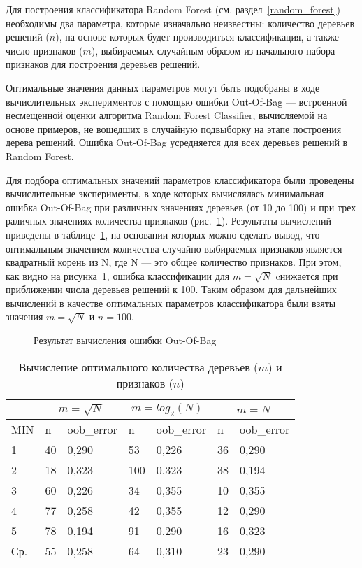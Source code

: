 Для построения классификатора Random Forest (см. раздел~\ref{random_forest}) необходимы два параметра, которые изначально неизвестны: количество деревьев решений ($ n $), на основе которых будет производиться классификация, а также число признаков ($ m $), выбираемых случайным образом из начального набора признаков для построения деревьев решений.

Оптимальные значения данных параметров могут быть подобраны в ходе вычислительных экспериментов с помощью ошибки Out-Of-Bag --- встроенной несмещенной оценки алгоритма Random Forest Classifier, вычисляемой на основе примеров, не вошедших в случайную подвыборку на этапе построения дерева решений. Ошибка Out-Of-Bag усредняется для всех деревьев решений в Random Forest.~\cite{random_forest}

Для подбора оптимальных значений параметров классификатора были проведены вычислительные эксперименты, в ходе которых вычислялась минимальная ошибка Out-Of-Bag при различных значениях деревьев (от 10 до 100) и при трех раличных значениях количества признаков (рис.~\ref{3:3}). Результаты вычислений приведены в таблице~\ref{tab:6}, на основании которых можно сделать вывод, что оптимальным значением количества случайно выбираемых признаков является квадратный корень из N, где N --- это общее количество признаков. При этом, как видно на рисунка~\ref{3:3}, ошибка классификации для $ m = \sqrt{N} $ cнижается при приближении числа деревьев решений к 100. Таким образом для дальнейших вычислений в качестве оптимальных параметров классификатора были взяты значения $ m = \sqrt{N} $ и $ n = 100 $.


\begin{figure}[h!]
\center{\texttt{[image: 3]}}
\caption{ Результат вычисления ошибки Out-Of-Bag }
\label{3:3}
\end{figure} 

\begin{table}[h!]
\caption{ Вычисление оптимального количества деревьев ($ m $) и признаков ($ n $) }
\label{tab:6}
\begin{center}
\begin{tabularx}{\linewidth}{|X|X|X|X|X|X|X|}
\hline
 & \multicolumn{2}{|c|}{$ m = \sqrt{N} $} & \multicolumn{2}{|c|}{$ m = log_{2}(N) $} & \multicolumn{2}{|c|}{$ m = N $} \\
\hline
MIN & n & oob\_error & n & oob\_error & n & oob\_error \\
\hline
1 & 40 & 0,290 & 53 & 0,226 & 36 & 0,290\\
\hline
2 & 18 & 0,323 & 100 & 0,323 & 38 & 0,194 \\
\hline
3 & 60 & 0,226 & 34 & 0,355 & 10 & 0,355 \\
\hline
4 & 77 & 0,258 & 42 & 0,355 & 12 & 0,290 \\
\hline
5 & 78 & 0,194 & 91 & 0,290 & 16 & 0,323 \\
\hline
Ср. & 55 & 0,258 & 64 & 0,310 & 23 & 0,290 \\
\hline
\end{tabularx}
\end{center}
\end{table}
